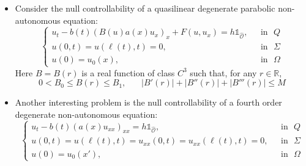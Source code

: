 \documentclass[11pt,oneside,a4papper]{osajnl}
\newcommand{\cara}{\mathbb{1}}
\begin{document}
\begin{itemize}
	\item Consider the null controllability of a quasilinear degenerate parabolic non-autonomous equation:
		$$	\begin{cases}
		u_t-b(t) (B(u){a}(x)u_{x})_{x}+F(u,u_{x})=h\cara_{{\widehat{\mathcal{O}}}}, & \ \ \ \text{in} \ \ \ Q\\
		u(0,t)=u(\ell(t),t)=0, & \ \ \ \text{in} \ \ \ \Sigma\\
		u(0)=u_0(x), & \ \ \ \text{in} \ \ \ \Omega
	\end{cases}$$
	Here $B = B(r)$ is a real function of class $C^3$ such that, for any $r\in \mathbb{R}$,
	$$0< B_0\leq B(r)\leq B_1, \ \ \ \ \ \ \ \ |B'(r)|+|B''(r)|+|B'''(r)|\leq M$$

\item Another interesting problem is the null controllability of a fourth order  degenerate non-autonomous equation:
$$
\begin{cases}
	u_t-b(t)\left({a}(x)u_{xx}\right)_{xx}=h\cara_{{\widehat{\mathcal{O}}}}, & \ \ \ \text{in} \ \ \ Q\\
	u(0,t)=u(\ell(t),t)=u_{xx}(0,t)=u_{xx}(\ell(t),t)=0, & \ \ \ \text{in} \ \ \ \Sigma\\
	u(0)=u_0(x'), & \ \ \ \text{in} \ \ \ \Omega
\end{cases}
$$







\end{itemize}
\end{document}
